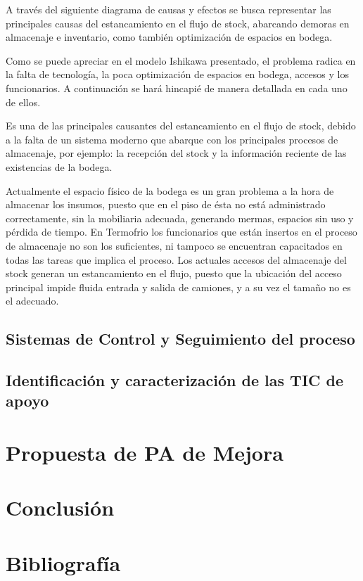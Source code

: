 	A través del siguiente diagrama de causas y efectos se busca representar las
principales causas del estancamiento en el flujo de stock, abarcando demoras en
almacenaje e inventario, como también optimización de espacios en bodega.	


Como se puede apreciar en el modelo Ishikawa presentado, el problema radica en la
falta de tecnología, la poca optimización de espacios en bodega, accesos y los
funcionarios. A continuación se hará hincapié de manera detallada en cada uno de
ellos.

 Es una de las principales causantes del estancamiento en el flujo de stock, debido a la falta de un sistema moderno que abarque con los principales procesos de almacenaje, por ejemplo: la recepción del stock y la información reciente de las existencias de la bodega.

 Actualmente el espacio físico de la bodega es un gran problema a la hora de almacenar los insumos, puesto que en el piso de ésta no está administrado correctamente, sin la mobiliaria adecuada,
generando mermas, espacios sin uso y pérdida de tiempo.
 En Termofrio los funcionarios que están insertos en el proceso de almacenaje no son los suficientes, ni tampoco se encuentran capacitados en todas las tareas que implica el proceso.
 Los actuales accesos del almacenaje del stock generan un estancamiento en el flujo, puesto que la ubicación del acceso principal impide fluida entrada y salida de camiones, y a su vez el tamaño no es el adecuado.

	\subsection{Sistemas de Control y Seguimiento del proceso}
	
	
	\subsection{Identificación y caracterización de las TIC de apoyo}
\section{Propuesta de PA de Mejora}
\section{Conclusión}
\section{Bibliografía}

	

